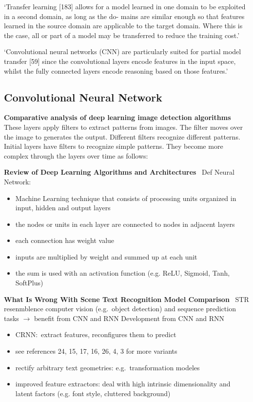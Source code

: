 `Transfer learning [183] allows for a model learned in one domain to be exploited in a second domain, as long as the do- mains are similar enough so that features learned in the source domain are applicable to the target domain. Where this is the case, all or part of a model may be transferred to reduce the training cost.'~\cite{ashmore_assuring_2021}

`Convolutional neural networks (CNN) are particularly suited for partial model transfer [59] since the convolutional layers encode features in the input space, whilst the fully connected layers encode reasoning based on those features.'~\cite{ashmore_assuring_2021}

\subsection*{Convolutional Neural Network}
\textbf{Comparative analysis of deep learning image detection
algorithms}~\citep{srivastava_comparative_2021}
These layers apply filters to extract patterns from images. The filter moves over the image to generates the output. Different filters recognize different patterns. Initial layers have filters to recognize simple patterns. They become more complex through the layers over time as follows:

\textbf{Review of Deep Learning Algorithms and Architectures}~\citep{shrestha_review_2019}
Def Neural Network:
\begin{itemize}
    \item Machine Learning technique that consists of processing units organized in input,
        hidden and output layers
    \item the nodes or units in each layer are connected to nodes in adjacent layers
    \item each connection has weight value
    \item inputs are multiplied by weight and summed up at each unit
    \item the sum is used with an activation function (e.g. ReLU, Sigmoid, Tanh, SoftPlus)
\end{itemize}

\textbf{What Is Wrong With Scene Text Recognition Model Comparison}~\cite{baek_what_2019}
\ac{STR} resenmblence computer vision (e.g.\ object detection) and sequence prediction
tasks $\rightarrow$ benefit from \ac{CNN} and \ac{RNN}
Development from \ac{CNN} and \ac{RNN}
\begin{itemize}
    \item CRNN:\ extract features, reconfigures them to predict
    \item see references 24, 15, 17, 16, 26, 4, 3 for more variants
    \item rectify arbitrary text geometries: e.g.\ transformation modeles
    \item improved feature extractors: deal with high intrinsic dimensionality and latent factors
        (e.g. font style, cluttered background)
\end{itemize}

